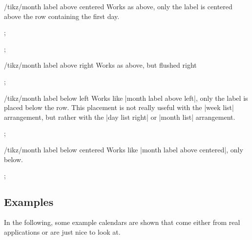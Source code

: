 \begin{stylekey}{/tikz/month label above centered}
    Works as above, only the label is centered above the row containing the
    first day.
\begin{codeexample}[]
\tikz
  \calendar [dates=2000-02-01 to 2000-02-last,
             day list right,month label above centered];
\end{codeexample}
\begin{codeexample}[]
\tikz
  \calendar [dates=2000-01-20 to 2000-02-10,
             week list,month label above centered];
\end{codeexample}
\end{stylekey}

\begin{stylekey}{/tikz/month label above right}
    Works as above, but flushed right
\begin{codeexample}[]
\tikz
  \calendar [dates=2000-01-20 to 2000-02-10,
             week list,month label above right];
\end{codeexample}
\end{stylekey}

\begin{stylekey}{/tikz/month label below left}
    Works like |month label above left|, only the label is placed below the
    row. This placement is not really useful with the |week list| arrangement,
    but rather with the |day list right| or |month list| arrangement.
\begin{codeexample}[]
\tikz
  \calendar [dates=2000-02-01 to 2000-02-last,
             day list right,month label below left];
\end{codeexample}
\end{stylekey}

\begin{stylekey}{/tikz/month label below centered}
    Works like |month label above centered|, only below.
\begin{codeexample}[]
\tikz
  \calendar [dates=2000-02-01 to 2000-02-last,
             day list right,month label below centered];
\end{codeexample}
\end{stylekey}


\subsection{Examples}

In the following, some example calendars are shown that come either from real
applications or are just nice to look at.

